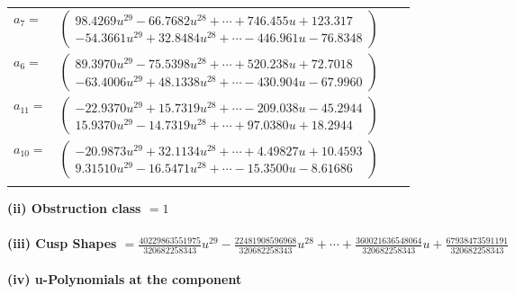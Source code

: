 \documentclass[1p]{elsarticle_modified}
\theoremstyle{definition}
\begin{document}
\begin{tabular}{m{7pt} m{180pt} m{7pt} m{180pt} }
\flushright $a_{7}=$&$\begin{pmatrix}98.4269 u^{29}-66.7682 u^{28}+\cdots+746.455 u+123.317\\-54.3661 u^{29}+32.8484 u^{28}+\cdots-446.961 u-76.8348\end{pmatrix}$ \\
\flushright $a_{6}=$&$\begin{pmatrix}89.3970 u^{29}-75.5398 u^{28}+\cdots+520.238 u+72.7018\\-63.4006 u^{29}+48.1338 u^{28}+\cdots-430.904 u-67.9960\end{pmatrix}$ \\
\flushright $a_{11}=$&$\begin{pmatrix}-22.9370 u^{29}+15.7319 u^{28}+\cdots-209.038 u-45.2944\\15.9370 u^{29}-14.7319 u^{28}+\cdots+97.0380 u+18.2944\end{pmatrix}$ \\
\flushright $a_{10}=$&$\begin{pmatrix}-20.9873 u^{29}+32.1134 u^{28}+\cdots+4.49827 u+10.4593\\9.31510 u^{29}-16.5471 u^{28}+\cdots-15.3500 u-8.61686\end{pmatrix}$\\&\end{tabular}
\flushleft \textbf{(ii) Obstruction class $= 1$}\\~\\
\flushleft \textbf{(iii) Cusp Shapes $= \frac{40229863551975}{320682258343} u^{29}-\frac{22481908596968}{320682258343} u^{28}+\cdots+\frac{360021636548064}{320682258343} u+\frac{67938473591191}{320682258343}$}\\~\\
\newpage\renewcommand{\arraystretch}{1}
\flushleft \textbf{(iv) u-Polynomials at the component}\newline \\
\end{document}
